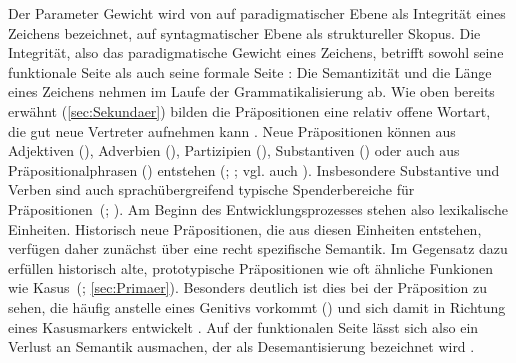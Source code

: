 Der Parameter Gewicht wird von \citet[]{Lehmann.1985} auf paradigmatischer Ebene als Integrität eines Zeichens bezeichnet, auf syntagmatischer Ebene als struktureller Skopus. 
Die Integrität, also das paradigmatische Gewicht eines Zeichens, betrifft sowohl seine funktionale Seite als auch seine formale Seite \citep[s.][305]{Lehmann.1985}: Die Semantizität und die Länge eines Zeichens nehmen im Laufe der Grammatikalisierung ab. 
Wie oben bereits erwähnt (\autoref{sec:Sekundaer}) bilden die Präpositionen eine relativ offene Wortart, die gut neue Vertreter aufnehmen kann \citep[518]{Eisenberg1979}. 
Neue Präpositionen können aus Adjektiven (), Adverbien (), Partizipien (), Substantiven () oder auch aus Präpositionalphrasen () entstehen (\citealp[s.][66]{DiMeola2001}; \citealp[215]{DiMeola2011}; vgl. auch \citealp{Braunmueller1985}).
Insbesondere Substantive und Verben sind auch sprach{\"u}bergreifend typische Spenderbereiche f{\"u}r Pr{\"a}positionen~(\citealp[672]{Kortmann.1992}; \citealp[512]{Konig.2012}). 
Am Beginn des Entwicklungsprozesses stehen also lexikalische Einheiten. 
Historisch neue Präpositionen, die aus diesen Einheiten entstehen, verfügen daher zunächst über eine recht spezifische Semantik. 
Im Gegensatz dazu erfüllen historisch alte, prototypische Präpositionen wie  oft {\"a}hnliche Funkionen wie Kasus~(\citealp[s.][45]{Rauh1990}; \autoref{sec:Primaer}). 
Besonders deutlich ist dies bei der Präposition  zu sehen, die häufig anstelle eines Genitivs vorkommt () und sich damit in Richtung eines Kasusmarkers entwickelt \citep[s.][6]{Lehmann1992}. 
Auf der funktionalen Seite lässt sich also ein Verlust an Semantik ausmachen, der als Desemantisierung bezeichnet wird \citep[s.][493]{Lehmann.1991}.

